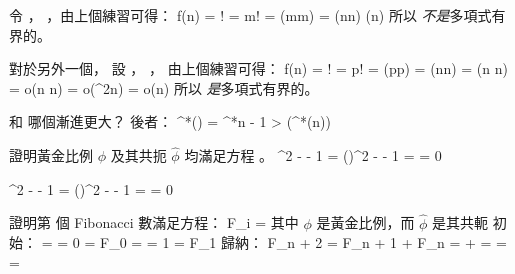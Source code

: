 令 ， ，由上個練習可得：
\startsplitformula\startmathalignment
 \NC \lg f(n) \NC = \lg \lceil{}\rceil ! \NR
 \NC          \NC = \lg m! \NR
 \NC          \NC = \Theta(m\lg m) \NR
 \NC          \NC = \Theta(\lceil\lg n\rceil \lg \lceil \lg n\rceil) \NR
 \NC          \NC \neq \Theta(\lg n) \NR
\stopmathalignment\stopsplitformula
所以  \emph{不是}多項式有界的。

對於另外一個，
設 ， ，
由上個練習可得：
\startsplitformula\startmathalignment
 \NC \lg f(n) \NC = \lg \lceil{}\rceil ! \NR
 \NC          \NC = \lg p! \NR
 \NC          \NC = \Theta(p\lg p) \NR
 \NC          \NC = \Theta(\lceil\lg\lg n\rceil \lg \lceil \lg\lg n\rceil) \NR
 \NC          \NC = \Theta(\lg\lg n \cdot \lg\lg\lg n) \NR
 \NC          \NC = o(\lg\lg n \cdot \lg\lg n) \NR
 \NC          \NC = o(\lg^2\lg n) \NR
 \NC          \NC = o(\lg n) \NR
\stopmathalignment\stopsplitformula
所以  \emph{是}多項式有界的。
\stopANSWER

\startEXERCISE\DIFFICULT
{} 和  哪個漸進更大？
\stopEXERCISE
\startANSWER
後者：
\startformula
\lg^*() = \lg^*n - 1 > \lg(\lg^*(n))
\stopformula
\stopANSWER

\startEXERCISE
證明黃金比例 $\phi$ 及其共扼 $\hat \phi$ 均滿足方程 。
\stopEXERCISE
\startANSWER
\startsplitformula\startmathalignment
 \NC \phi^2 - \phi - 1
     \NC = ()^2 -  - 1 \NR
 \NC \NC =  \NR
 \NC \NC = 0 \NR
\stopmathalignment\stopsplitformula

\startsplitformula\startmathalignment
 \NC \hat\phi^2 - \hat\phi - 1
     \NC = ()^2 -  - 1 \NR
 \NC \NC =  \NR
 \NC \NC = 0 \NR
\stopmathalignment\stopsplitformula
\stopANSWER

\startEXERCISE
證明第  個 Fibonacci 數滿足方程：
\startformula
F_i = 
\stopformula
其中 $\phi$ 是黃金比例，而 $\hat \phi$ 是其共軛
\stopEXERCISE
\startANSWER
初始：
\startsplitformula\startmathalignment
\NC {}
    \NC =  = 0 = F_0 \NR
\NC {}
    \NC =  = 1 = F_1 \NR
\stopmathalignment\stopsplitformula
歸納：
\startsplitformula\startmathalignment
 \NC F_{n + 2} \NC = F_{n + 1} + F_n \NR
 \NC \NC =  +  \NR
 \NC \NC =  \NR
 \NC \NC =  \NR
 \NC \NC =  \NR
\stopmathalignment\stopsplitformula
\stopANSWER

